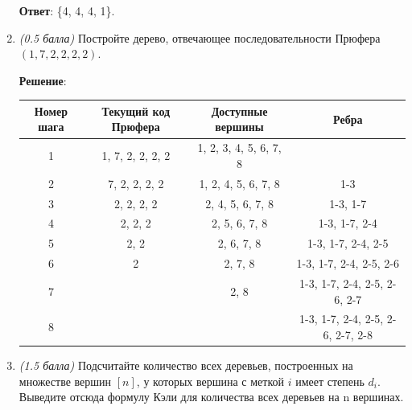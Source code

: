 \documentclass{article}
\begin{document}
\begin{enumerate}
    \textbf{Ответ}: \{4, 4, 4, 1\}.

    \item \textit{(0.5 балла)} Постройте дерево, отвечающее последовательности Прюфера $(1, 7, 2, 2, 2, 2)$.
    
    \textbf{Решение}:
    
    \begin{table}[h]
        \centering
        \begin{tabular}{|c|c|c|c|}
            \hline
            Номер шага & Текущий код Прюфера & Доступные вершины & Ребра \\
            \hline
            1 & 1, 7, 2, 2, 2, 2 & 1, 2, 3, 4, 5, 6, 7, 8 & \\
            \hline
            2 & 7, 2, 2, 2, 2 & 1, 2, 4, 5, 6, 7, 8 & 1-3 \\
            \hline
            3 & 2, 2, 2, 2 & 2, 4, 5, 6, 7, 8 & 1-3, 1-7 \\
            \hline
            4 & 2, 2, 2 & 2, 5, 6, 7, 8 & 1-3, 1-7, 2-4 \\
            \hline
            5 & 2, 2 & 2, 6, 7, 8 & 1-3, 1-7, 2-4, 2-5 \\
            \hline
            6 & 2 & 2, 7, 8 & 1-3, 1-7, 2-4, 2-5, 2-6 \\
            \hline
            7 & & 2, 8 & 1-3, 1-7, 2-4, 2-5, 2-6, 2-7 \\
            \hline
            8 & & & 1-3, 1-7, 2-4, 2-5, 2-6, 2-7, 2-8 \\
            \hline
        \end{tabular}
    \end{table}

    \item \textit{(1.5 балла)} Подсчитайте количество всех деревьев, построенных на множестве вершин $[n]$, у которых вершина с меткой $i$ имеет степень $d_i$. Выведите отсюда формулу Кэли для количества всех деревьев на n вершинах.
\end{enumerate}
\end{document}
